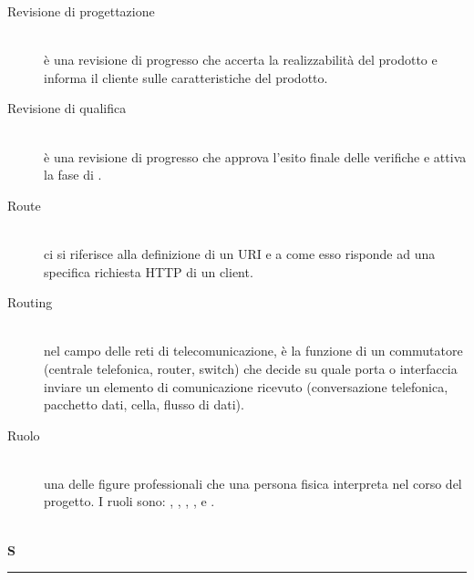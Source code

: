 \documentclass[12pt,a4paper]{article}
\begin{document}
\begin{description}
\item[Revisione di progettazione] 
\hfill\\è una revisione di progresso che accerta la realizzabilità del prodotto e informa il cliente sulle caratteristiche del prodotto.

\item[Revisione di qualifica] 
\hfill\\è una revisione di progresso che approva l'esito finale delle verifiche e attiva la fase di .

\item[Route] 
\hfill\\ci si riferisce alla definizione di un URI e a come esso risponde ad una specifica richiesta HTTP di un client.

\item[Routing] 
\hfill\\nel campo delle reti di telecomunicazione, è la funzione di un commutatore (centrale telefonica, router, switch) che decide su quale porta o interfaccia inviare un elemento di comunicazione ricevuto (conversazione telefonica, pacchetto dati, cella, flusso di dati).

\item[Ruolo] 
\hfill\\una delle figure professionali che una persona fisica interpreta nel corso del progetto. I ruoli sono: , , , ,  e .
\end{description}

\newpage

\begin{center}
\hfill\\
	\LARGE \textbf{S}
\hfill\\
\rule[15pt]{30pt}{0.5pt}
\end{center}
\end{document}
